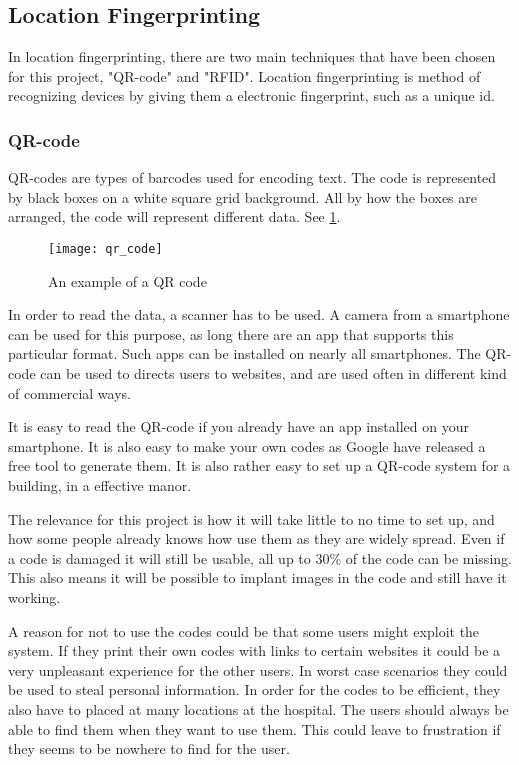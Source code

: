 \subsection{Location Fingerprinting}
In location fingerprinting, there are two main techniques that have been chosen for this project, "QR-code" and "RFID". Location fingerprinting is method of recognizing devices by giving them a electronic fingerprint, such as a unique id.

\subsubsection{QR-code} %
QR-codes are types of barcodes used for encoding text. The code is represented by black boxes on a white square grid background. All by how the boxes are arranged, the code will represent different data. See \cref{fig:qr}.

\begin{figure}
	\begin{center}
		\texttt{[image: qr\_code]}
	\end{center}
	\caption{An example of a QR code}
	\label{fig:qr}
\end{figure}	

In order to read the data, a scanner has to be used. A camera from a smartphone can be used for this purpose, as long there are an app that supports this particular format. Such apps can be installed on nearly all smartphones\cite{QR_smart}. The QR-code can be used to directs users to websites, and are used often in different kind of commercial ways\cite{QR_url}.

It is easy to read the QR-code if you already have an app installed on your smartphone. It is also easy to make your own codes as Google have released a free tool to generate them\cite{QR_Google}. It is also rather easy to set up a QR-code system for a building, in a effective manor\cite{QR_easy}.

The relevance for this project is how it will take little to no time to set up\cite{QR_rel1}, and how some people already knows how use them as they are widely spread\cite{QR_spread}. Even if a code is damaged it will still be usable, all up to 30\% of the code can be missing\cite{QR_dama}. This also means it will be possible to implant images in the code and still have it working\cite{QR_image}.

A reason for not to use the codes could be that some users might exploit the system. If they print their own codes with links to certain websites it could be a very unpleasant experience for the other users\cite{QR_urlbad}. In worst case scenarios they could be used to steal personal information\cite{QR_information}.
In order for the codes to be efficient, they also have to placed at many locations at the hospital. The users should always be able to find them when they want to use them. This could leave to frustration if they seems to be nowhere to find for the user.


